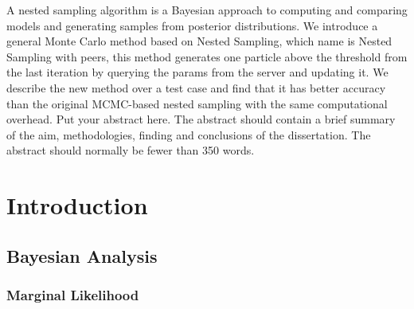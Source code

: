 \documentclass[11pt]{book}
\begin{document}
A nested sampling algorithm is a Bayesian approach to computing and comparing models and generating samples from posterior distributions. We introduce a general Monte Carlo method based on Nested Sampling, which name is Nested Sampling with peers, this method generates one particle above the threshold from the last iteration by querying the params from the server and updating it. We describe the new method over a test case and find that it has better accuracy than the original MCMC-based nested sampling with the same computational overhead.
 Put your abstract  here.  
 The abstract should contain a brief summary of the aim, methodologies, 
finding and conclusions of the dissertation.  The abstract should normally be fewer than 350 words.





\setcounter{secnumdepth}{3} %
\setcounter{tocdepth}{3}    %
\tableofcontents            %



	
\chapter{Introduction}%

\section{Bayesian Analysis} 

\subsection{Marginal Likelihood}
\end{document}
